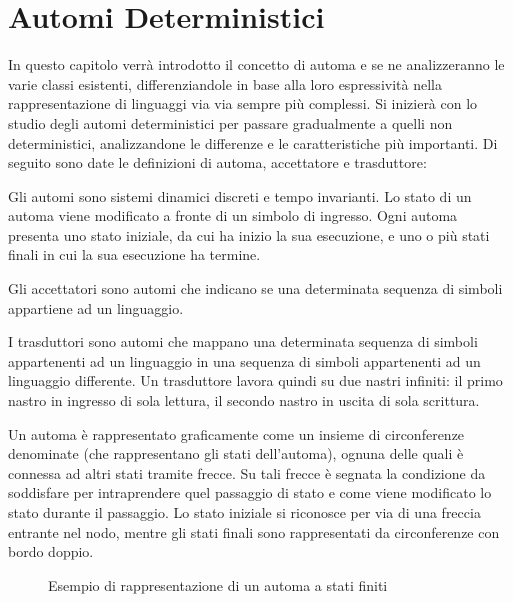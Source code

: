 \chapter{Automi Deterministici}
  In questo capitolo verrà introdotto il concetto di automa e se ne analizzeranno le varie classi esistenti, differenziandole in base alla loro espressività nella rappresentazione di linguaggi via via sempre più complessi. Si inizierà con lo studio degli automi deterministici per passare gradualmente a quelli non deterministici, analizzandone le differenze e le caratteristiche più importanti. Di seguito sono date le definizioni di automa, accettatore e trasduttore:

  \begin{definition}
    Gli automi sono sistemi dinamici discreti e tempo invarianti. Lo stato di un automa viene modificato a fronte di un simbolo di ingresso. Ogni automa presenta uno stato iniziale, da cui ha inizio la sua esecuzione, e uno o più stati finali in cui la sua esecuzione ha termine. 
  \end{definition}

  \begin{definition}
    Gli accettatori sono automi che indicano se una determinata sequenza di simboli appartiene ad un linguaggio.    
  \end{definition}

  \begin{definition}
    I trasduttori sono automi che mappano una determinata sequenza di simboli appartenenti ad un linguaggio in una sequenza di simboli appartenenti ad un linguaggio differente. Un trasduttore lavora quindi su due nastri infiniti:
    il primo nastro in ingresso di sola lettura, il secondo nastro in uscita di sola scrittura. 
  \end{definition}

  Un automa è rappresentato graficamente come un insieme di circonferenze denominate (che rappresentano gli stati dell'automa), ognuna delle quali è connessa ad altri stati tramite frecce. Su tali frecce è segnata la condizione da soddisfare per intraprendere quel passaggio di stato e come viene modificato lo stato durante il passaggio. Lo stato iniziale si riconosce per via di una freccia entrante nel nodo, mentre gli stati finali sono rappresentati da circonferenze con bordo doppio. 

  \begin{figure}[h!]
    \begin{center}
    \end{center}
    \caption{Esempio di rappresentazione di un automa a stati finiti}
  \end{figure}

